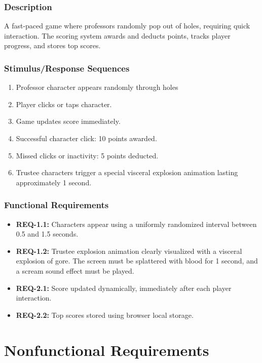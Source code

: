\documentclass{scrreprt}
\begin{document}
\subsection{Description}
A fast-paced game where professors randomly pop out of holes, requiring quick interaction. The scoring system awards and deducts points, tracks player progress, and stores top scores. 

\subsection{Stimulus/Response Sequences}
\begin{enumerate}
    \item Professor character appears randomly through holes
    \item Player clicks or taps character.
    \item Game updates score immediately.
    \item Successful character click: 10 points awarded.
    \item Missed clicks or inactivity: 5 points deducted.
    \item Trustee characters trigger a special visceral explosion animation lasting approximately 1 second.
\end{enumerate}

\subsection{Functional Requirements}
\begin{itemize}
    \item \textbf{REQ-1.1:} Characters appear using a uniformly randomized interval between 0.5 and 1.5 seconds.
    \item \textbf{REQ-1.2:} Trustee explosion animation clearly visualized with a visceral explosion of gore. The screen must be splattered with blood for 1 second, and a scream sound effect must be played.
    \item \textbf{REQ-2.1:} Score updated dynamically, immediately after each player interaction.
    \item \textbf{REQ-2.2:} Top scores stored using browser local storage.
\end{itemize}

\chapter{Nonfunctional Requirements}
\end{document}
